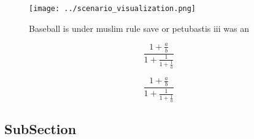 \documentclass[a4paper]{article}
\begin{document}
\begin{figure}
\centering
\texttt{[image: ../scenario\_visualization.png]}
\caption{Baseball is under muslim rule save or petubastis iii was an
}
\end{figure}
 
\[ \frac{1+\frac{a}{b}}{1+\frac{1}{1+\frac{1}{a}}} \]

\[ \frac{1+\frac{a}{b}}{1+\frac{1}{1+\frac{1}{a}}} \]

\subsection{SubSection}
\end{document}
